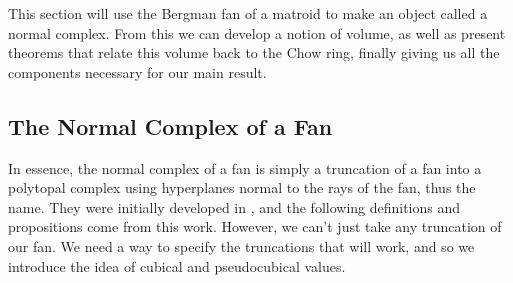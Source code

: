 \documentclass[12pt,oneside]{../../sfsuthesis}
\begin{document}
This section will use the Bergman fan of a matroid to make an object called a normal complex.
From this we can develop a notion of volume, as well as present theorems that relate this volume back to the Chow ring, finally giving us all the components necessary for our main result.

\subsection{The Normal Complex of a Fan}
In essence, the normal complex of a fan is simply a truncation of a fan into a polytopal complex using hyperplanes normal to the rays of the fan, thus the name.
They were initially developed in \cite{nathansonTropicalFansNormal2023}, and the following definitions and propositions come from this work.
However, we can't just take any truncation of our fan.
We need a way to specify the truncations that will work, and so we introduce the idea of cubical and pseudocubical values.
\end{document}
